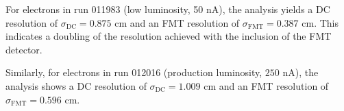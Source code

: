     For electrons in run 011983 (low luminosity, 50 nA), the analysis yields a DC resolution of $\sigma_\text{DC} = 0.875$ cm and an FMT resolution of $\sigma_\text{FMT} = 0.387$ cm.
    This indicates a doubling of the resolution achieved with the inclusion of the FMT detector.

    Similarly, for electrons in run 012016 (production luminosity, $250$ nA), the analysis shows a DC resolution of $\sigma_\text{DC} = 1.009$ cm and an FMT resolution of $\sigma_\text{FMT} = 0.596$ cm.

